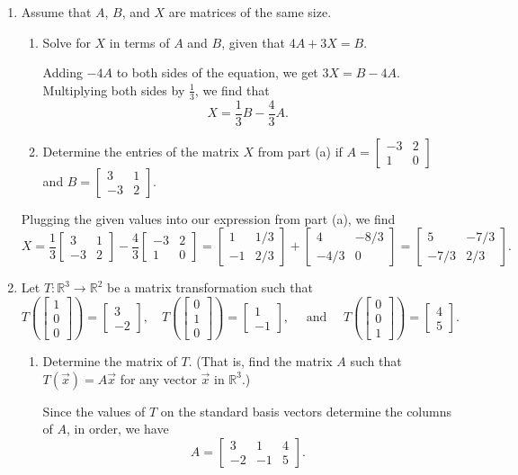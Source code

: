 \documentclass[12pt]{article}
\newcommand{\points}[1]{\marginpar{\hspace{24pt}[#1]}}
\newcommand{\R}{\mathbb{R}}
\newcommand{\bbm}{\begin{bmatrix}}
\newcommand{\ebm}{\end{bmatrix}}
\begin{document}
\begin{enumerate}
\item Assume that $A$, $B$, and $X$ are matrices of the same size.
\begin{enumerate}
 \item Solve for $X$ in terms of $A$ and $B$, given that $4A+3X=B$.\points{3}

\bigskip

Adding $-4A$ to both sides of the equation, we get $3X=B-4A$. Multiplying both sides by $\frac{1}{3}$, we find that
\[
 X = \frac{1}{3}B-\frac{4}{3}A.
\]

\medskip

 \item Determine the entries of the matrix $X$ from part (a) if $A=\bbm -3&2\\1&0\ebm$ and $B=\bbm 3&1\\-3&2\ebm$.\points{3}
\end{enumerate}

\bigskip

Plugging the given values into our expression from part (a), we find 
\[
 X = \frac{1}{3}\bbm 3&1\\-3&2\ebm-\frac{4}{3}\bbm -3&2\\1&0\ebm = \bbm 1 & 1/3\\-1&2/3\ebm+\bbm 4 & -8/3\\-4/3 & 0\ebm = \bbm 5 & -7/3\\-7/3 & 2/3\ebm.
\]

\medskip


\item Let $T:\R^3\to \R^2$ be a matrix transformation such that
\[
 T\left(\bbm 1\\0\\0\ebm\right) = \bbm 3\\-2\ebm,\quad T\left(\bbm 0\\1\\0\ebm\right) = \bbm 1\\-1\ebm, \quad \text{ and } \quad T\left(\bbm 0\\0\\1\ebm\right) = \bbm 4\\5\ebm.
\]
\begin{enumerate}
 \item Determine the matrix of $T$. (That is, find the matrix $A$ such that $T(\vec{x})=A\vec{x}$ for any vector $\vec{x}$ in $\R^3$.) \points{3}

\bigskip

Since the values of $T$ on the standard basis vectors determine the columns of $A$, in order, we have
\[
 A = \bbm 3&1&4\\-2&-1&5\ebm.
\]


\end{enumerate}
\end{enumerate}
\end{document}
